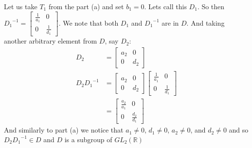 \documentclass[letterpaper]{article}
\begin{document}
\begin{enumerate}
\begin{enumerate}
\begin{enumerate}
      Let us take $T_1$ from the part (a) and set $b_1=0$. Lets call this $D_1$. So then ${D_1}^{-1}=\left[\begin{array}{cc}\frac{1}{a_1}&0\\0&\frac{1}{d_1}\end{array}\right]$. We note that both $D_1$ and ${D_1}^{-1}$ are in $D$. And taking another arbitrary element from $D$, say $D_2$:
      \begin{align*}
        D_2&=\left[\begin{array}{cc}a_2&0\\0&d_2\end{array}\right]\\
        D_2{D_1}^{-1}&=\left[\begin{array}{cc}a_2&0\\0&d_2\end{array}\right]
        \left[\begin{array}{cc}\frac{1}{a_1}&0\\0&\frac{1}{d_1}\end{array}\right]\\
        &=\left[\begin{array}{cc}\frac{a_2}{a_1}&0\\0&\frac{d_2}{d_1}\end{array}\right]
      \end{align*}
      And similarly to part (a) we notice that $a_1\ne 0$, $d_1\ne 0$, $a_2\ne 0$, and $d_2\ne 0$ and so $D_2{D_1}^{-1}\in D$ and $D$ is a subgroup of $GL_2\left(\mathbb{R}\right)$
    \end{enumerate}
  \end{enumerate}
\end{enumerate}
\end{document}
